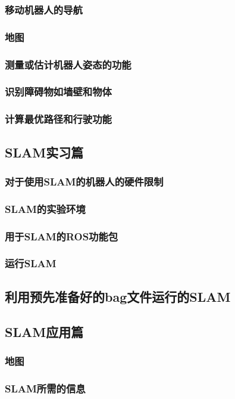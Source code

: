 \documentclass[geye,green,kindle,cn]{elegantnote}
\begin{document}
\subsubsection{移动机器人的导航}
\subsubsection{地图}
\subsubsection{测量或估计机器人姿态的功能}
\subsubsection{识别障碍物如墙壁和物体}
\subsubsection{计算最优路径和行驶功能}
\subsection{SLAM实习篇}
\subsubsection{对于使用SLAM的机器人的硬件限制}
\subsubsection{SLAM的实验环境}
\subsubsection{用于SLAM的ROS功能包}
\subsubsection{运行SLAM}
\subsection{利用预先准备好的bag文件运行的SLAM}
\subsection{SLAM应用篇}
\subsubsection{地图}
\subsubsection{SLAM所需的信息}
\end{document}
